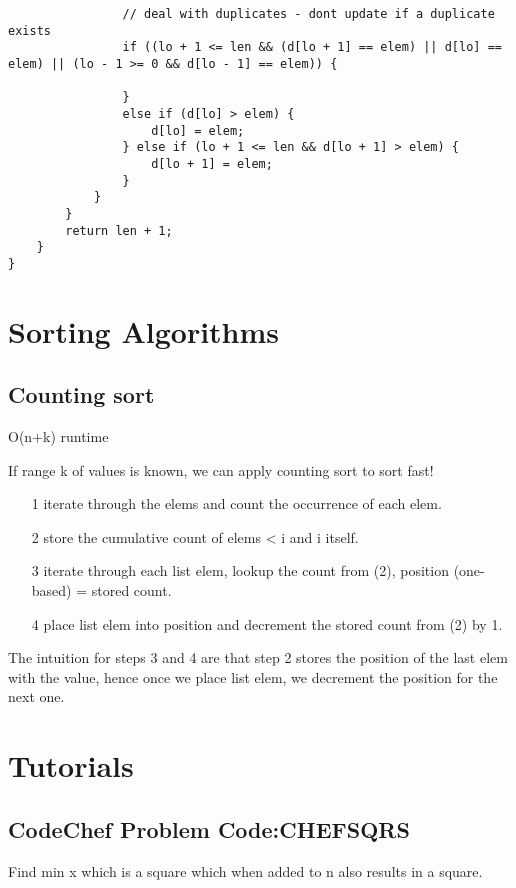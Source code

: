 \documentclass[12pt]{article}
\begin{document}
{\begin{verbatim}
                // deal with duplicates - dont update if a duplicate exists 
                if ((lo + 1 <= len && (d[lo + 1] == elem) || d[lo] == elem) || (lo - 1 >= 0 && d[lo - 1] == elem)) {
                    
                }
                else if (d[lo] > elem) {
                    d[lo] = elem;
                } else if (lo + 1 <= len && d[lo + 1] > elem) {
                    d[lo + 1] = elem;
                }
            }
        }
        return len + 1; 
    }
}
\end{verbatim} 

\section{Sorting Algorithms} 

\subsection{Counting sort}

O(n+k) runtime 

If range k of values is known, we can apply counting sort to sort fast! 

\begin{itemize} 
	\item[1] iterate through the elems and count the occurrence of each elem. 
	\item[2] store the cumulative count of elems < i and i itself. 
	\item[3] iterate through each list elem, lookup the count from (2), position (one-based) = stored count. 
	\item[4] place list elem into position and decrement the stored count from (2) by 1. 
\end{itemize} 

The intuition for steps 3 and 4 are that step 2 stores the position of the last elem with the value, hence once we place list elem, we decrement the position for the next one. 

\section{Tutorials} 

\subsection{CodeChef Problem Code:CHEFSQRS}
Find min x which is a square which when added to n also results in a square. \\ [\baselineskip] 

}
\end{document}
